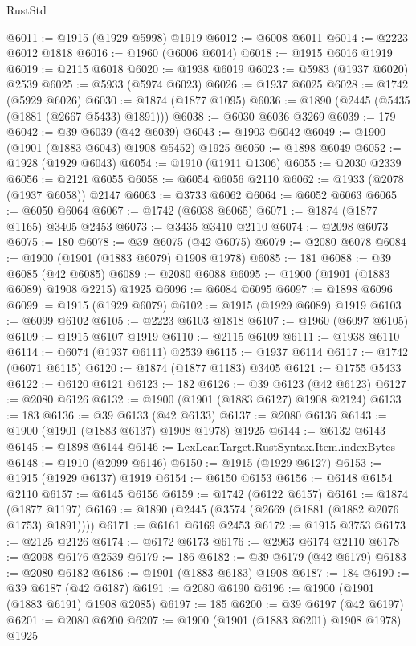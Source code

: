 \begin{lexlean}{RustStd}
\begin{coremodule}
{\begin{coremodule}
{{{{{{{{{{{{{{{{{{{{{{{{{{{{{{{{{{{{{{{{{{{@6011 := @1915 (@1929 @5998) @1919
@6012 := @6008 @6011
@6014 := @2223 @6012 @1818
@6016 := @1960 (@6006 @6014)
@6018 := @1915 @6016 @1919
@6019 := @2115 @6018
@6020 := @1938 @6019
@6023 := @5983 (@1937 @6020) @2539
@6025 := @5933 (@5974 @6023)
@6026 := @1937 @6025
@6028 := @1742 (@5929 @6026)
@6030 := @1874 (@1877 @1095)
@6036 := @1890 (@2445 (@5435 (@1881 (@2667 @5433) @1891)))
@6038 := @6030 @6036 @3269
@6039 := 179
@6042 := @39 @6039 (@42 @6039)
@6043 := @1903 @6042
@6049 := @1900 (@1901 (@1883 @6043) @1908 @5452) @1925
@6050 := @1898 @6049
@6052 := @1928 (@1929 @6043)
@6054 := @1910 (@1911 @1306)
@6055 := @2030 @2339
@6056 := @2121 @6055
@6058 := @6054 @6056 @2110
@6062 := @1933 (@2078 (@1937 @6058)) @2147
@6063 := @3733 @6062
@6064 := @6052 @6063
@6065 := @6050 @6064
@6067 := @1742 (@6038 @6065)
@6071 := @1874 (@1877 @1165) @3405 @2453
@6073 := @3435 @3410 @2110
@6074 := @2098 @6073
@6075 := 180
@6078 := @39 @6075 (@42 @6075)
@6079 := @2080 @6078
@6084 := @1900 (@1901 (@1883 @6079) @1908 @1978)
@6085 := 181
@6088 := @39 @6085 (@42 @6085)
@6089 := @2080 @6088
@6095 := @1900 (@1901 (@1883 @6089) @1908 @2215) @1925
@6096 := @6084 @6095
@6097 := @1898 @6096
@6099 := @1915 (@1929 @6079)
@6102 := @1915 (@1929 @6089) @1919
@6103 := @6099 @6102
@6105 := @2223 @6103 @1818
@6107 := @1960 (@6097 @6105)
@6109 := @1915 @6107 @1919
@6110 := @2115 @6109
@6111 := @1938 @6110
@6114 := @6074 (@1937 @6111) @2539
@6115 := @1937 @6114
@6117 := @1742 (@6071 @6115)
@6120 := @1874 (@1877 @1183) @3405
@6121 := @1755 @5433
@6122 := @6120 @6121
@6123 := 182
@6126 := @39 @6123 (@42 @6123)
@6127 := @2080 @6126
@6132 := @1900 (@1901 (@1883 @6127) @1908 @2124)
@6133 := 183
@6136 := @39 @6133 (@42 @6133)
@6137 := @2080 @6136
@6143 := @1900 (@1901 (@1883 @6137) @1908 @1978) @1925
@6144 := @6132 @6143
@6145 := @1898 @6144
@6146 := LexLeanTarget.RustSyntax.Item.indexBytes
@6148 := @1910 (@2099 @6146)
@6150 := @1915 (@1929 @6127)
@6153 := @1915 (@1929 @6137) @1919
@6154 := @6150 @6153
@6156 := @6148 @6154 @2110
@6157 := @6145 @6156
@6159 := @1742 (@6122 @6157)
@6161 := @1874 (@1877 @1197)
@6169 := @1890 (@2445 (@3574 (@2669 (@1881 (@1882 @2076 @1753) @1891))))
@6171 := @6161 @6169 @2453
@6172 := @1915 @3753
@6173 := @2125 @2126
@6174 := @6172 @6173
@6176 := @2963 @6174 @2110
@6178 := @2098 @6176 @2539
@6179 := 186
@6182 := @39 @6179 (@42 @6179)
@6183 := @2080 @6182
@6186 := @1901 (@1883 @6183) @1908
@6187 := 184
@6190 := @39 @6187 (@42 @6187)
@6191 := @2080 @6190
@6196 := @1900 (@1901 (@1883 @6191) @1908 @2085)
@6197 := 185
@6200 := @39 @6197 (@42 @6197)
@6201 := @2080 @6200
@6207 := @1900 (@1901 (@1883 @6201) @1908 @1978) @1925
}}}}}}}}}}}}}}}}}}}}}}}}}}}}}}}}}}}}}}}}}}}
\end{coremodule}}
\end{coremodule}
\end{lexlean}
